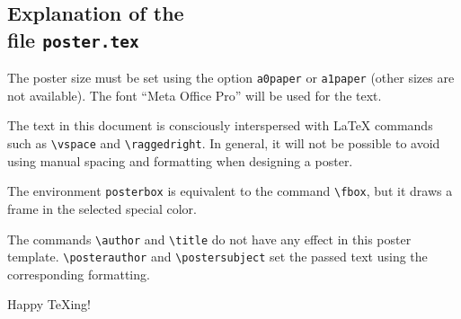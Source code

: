 \documentclass[a1paper]{article}
\begin{document}

\begin{posterbox}
	\vspace{-10mm}
	\raggedright

	\section*{Explanation of the\\file \texttt{poster.tex}}
	The poster size must be set using the option \verb+a0paper+ or \verb+a1paper+ (other sizes are not available).
	The font “Meta Office Pro” will be used for the text.

	The text in this document is consciously interspersed with \LaTeX{} commands such as \verb+\vspace+ and \verb+\raggedright+.
	In general, it will not be possible to avoid using manual spacing and formatting when designing a poster.

	The environment \verb+posterbox+ is equivalent to the command \verb+\fbox+, but it draws a frame in the selected special color.

	The commands \verb+\author+ and \verb+\title+ do not have any effect in this poster template.
	\verb+\posterauthor+ and \verb+\postersubject+ set the passed text using the corresponding formatting.

	\bigskip

	Happy \TeX{}ing!
\end{posterbox}

\vfill
\end{document}
